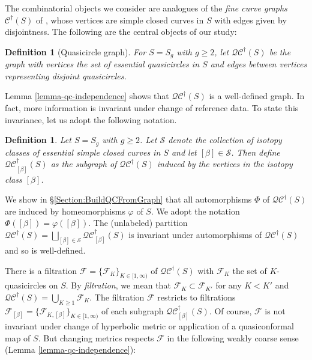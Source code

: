 \documentclass[12pt,a4paper]{amsart}
\theoremstyle{definition}
\theoremstyle{plain}
\newtheorem{definition}[theorem]{Definition}
\numberwithin{equation}{section}
\newcommand{\qcg}{\mathcal{QC}^{\dagger}}
\begin{document}
The combinatorial objects we consider are analogues of the \textit{fine curve graphs} $\mathcal{C}^\dagger(S)$ of \cite{bowden2022quasimorphisms}, whose vertices are simple closed curves in $S$ with edges given by disjointness.
The following are the central objects of our study:

\begin{definition}[Quasicircle graph]
    For $S = S_g$ with $g \geq 2$, let $\mathcal{QC}^\dagger(S)$ be the graph with vertices the set of essential quasicircles in $S$ and edges between vertices representing disjoint quasicircles.
\end{definition}

Lemma \ref{lemma-qc-independence} shows that $\mathcal{QC}^\dagger(S)$ is a well-defined graph.
In fact, more information is invariant under change of reference data. 
To state this invariance, let us adopt the following notation.

\begin{definition}
    Let $S = S_g$ with $g \geq 2$.
    Let $\mathscr{S}$ denote the collection of isotopy classes of essential simple closed curves in $S$ and let $[\beta] \in \mathscr{S}$.
    Then define $\mathcal{QC}^\dagger_{[\beta]}(S)$ as the subgraph of $\mathcal{QC}^\dagger(S)$ induced by the vertices in the isotopy class $[\beta]$.
\end{definition}

We show in \S\ref{Section:BuildQCFromGraph}  that all automorphisms $\Phi$ of $\mathcal{QC}^\dagger(S)$ are induced by homeomorphisms $\varphi$ of $S$. 
We adopt the notation $\Phi([\beta]) = \varphi([\beta])$.
The (unlabeled) partition $\qcg(S) = \bigsqcup_{[\beta]\in \mathscr{S}} \qcg_{[\beta]}(S)$ is invariant under automorphisms of $\qcg(S)$ and so is well-defined.

There is a filtration $\mathcal{F} = \{ \mathcal{F}_K\}_{K \in [1,\infty)}$ of $\qcg(S)$ with $\mathcal{F}_K$ the set of $K$-quasicircles on $S$.
By \textit{filtration}, we mean that $\mathcal{F}_{K} \subset \mathcal{F}_{K'}$ for any $K < K'$ and $\mathcal{QC}^\dagger(S) = \bigcup_{K \geq 1}\mathcal{F}_K$.
The filtration $\mathcal{F}$ restricts to filtrations $\mathcal{F}_{[\beta]} = \{ \mathcal{F}_{K, [\beta]}\}_{K \in [1,\infty)}$ of each subgraph $\qcg_{[\beta]}(S)$.
Of course, $\mathcal{F}$ is not invariant under change of hyperbolic metric or application of a quasiconformal map of $S$.
But changing metrics respects $\mathcal{F}$ in the following weakly coarse sense (Lemma \ref{lemma-qc-independence}):
\end{document}
